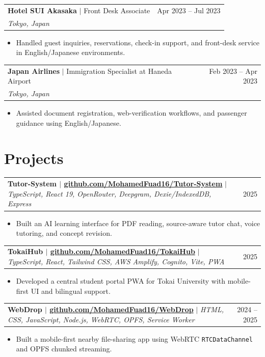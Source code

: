 \documentclass[10pt, a4paper]{article}
\makeatletter
\newcommand{\cventry}[4]{%
  \vspace{1.5pt}
  \begin{tabularx}{\linewidth}{@{}Xr@{}}
    \textbf{\color{darkgray}#1} \textcolor{medgray}{\small $|$ #2} & \textcolor{medgray}{\small #4}\\
    \textcolor{accentblue}{\small\itshape #3} & \\
  \end{tabularx}
  \vspace{-1.5pt}
}
\newcommand{\cvproject}[3]{%
  \vspace{1.5pt}
  \begin{tabularx}{\linewidth}{@{}Xr@{}}
    \textbf{\color{darkgray}#1} \textcolor{medgray}{\small $|$ \textit{#2}} & \textcolor{medgray}{\small #3}\\
  \end{tabularx}
  \vspace{-1.5pt}
}
\newenvironment{cvbullets}{%
  \begin{itemize}[leftmargin=1em, itemsep=0.2pt, topsep=0.5pt, parsep=0pt]
  \small\color{darkgray}
}{%
  \end{itemize}\vspace{1pt}
}
\makeatother
\begin{document}
\cventry{Hotel SUI Akasaka}{Front Desk Associate}{Tokyo, Japan}{Apr 2023 -- Jul 2023}
\begin{cvbullets}
  \item Handled guest inquiries, reservations, check-in support, and front-desk service in English/Japanese environments.
\end{cvbullets}

\cventry{Japan Airlines}{Immigration Specialist at Haneda Airport}{Tokyo, Japan}{Feb 2023 -- Apr 2023}
\begin{cvbullets}
  \item Assisted document registration, web-verification workflows, and passenger guidance using English/Japanese.
\end{cvbullets}

\section{Projects}

\cvproject{Tutor-System $|$ \small\color{medgray}\href{https://github.com/MohamedFuad16/Tutor-System}{github.com/MohamedFuad16/Tutor-System}}{TypeScript, React 19, OpenRouter, Deepgram, Dexie/IndexedDB, Express}{2025}
\begin{cvbullets}
  \item Built an AI learning interface for PDF reading, source-aware tutor chat, voice tutoring, and concept revision.
\end{cvbullets}

\cvproject{TokaiHub $|$ \small\color{medgray}\href{https://github.com/MohamedFuad16/TokaiHub}{github.com/MohamedFuad16/TokaiHub}}{TypeScript, React, Tailwind CSS, AWS Amplify, Cognito, Vite, PWA}{2025}
\begin{cvbullets}
  \item Developed a central student portal PWA for Tokai University with mobile-first UI and bilingual support.
\end{cvbullets}

\cvproject{WebDrop $|$ \small\color{medgray}\href{https://github.com/MohamedFuad16/WebDrop}{github.com/MohamedFuad16/WebDrop}}{HTML, CSS, JavaScript, Node.js, WebRTC, OPFS, Service Worker}{2024 -- 2025}
\begin{cvbullets}
  \item Built a mobile-first nearby file-sharing app using WebRTC \texttt{RTCDataChannel} and OPFS chunked streaming.
\end{cvbullets}
\end{document}
